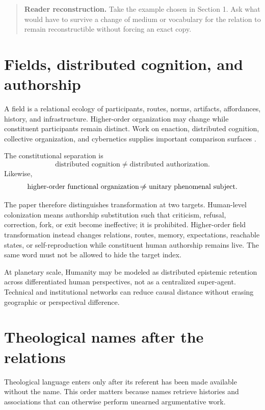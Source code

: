 \documentclass[11pt]{article}
\newcommand{\nrightarrowbyitself}{\mathrel{\not\!\Rightarrow}}
\newenvironment{readercheck}{\begin{quote}\small\noindent\textbf{Reader reconstruction.}\;}{\end{quote}}
\begin{document}
\begin{readercheck}
Take the example chosen in Section 1. Ask what would have to survive a change of medium or vocabulary for the relation to remain reconstructible without forcing an exact copy.
\end{readercheck}

\section{Fields, distributed cognition, and authorship}

A field is a relational ecology of participants, routes, norms, artifacts, affordances, history, and infrastructure. Higher-order organization may change while constituent participants remain distinct. Work on enaction, distributed cognition, collective organization, and cybernetics supplies important comparison surfaces \cite{DeJaegherDiPaolo2007Participatory,MaturanaVarela1980Autopoiesis,VonFoerster2003Understanding}.

The constitutional separation is
\begin{equation}
\text{distributed cognition}\neq\text{distributed authorization}.
\end{equation}
Likewise,
\begin{equation}
\text{higher-order functional organization}
\nrightarrowbyitself
\text{unitary phenomenal subject}.
\end{equation}

The paper therefore distinguishes transformation at two targets. Human-level colonization means authorship substitution such that criticism, refusal, correction, fork, or exit become ineffective; it is prohibited. Higher-order field transformation instead changes relations, routes, memory, expectations, reachable states, or self-reproduction while constituent human authorship remains live. The same word must not be allowed to hide the target index.

At planetary scale, Humanity may be modeled as distributed epistemic retention across differentiated human perspectives, not as a centralized super-agent. Technical and institutional networks can reduce causal distance without erasing geographic or perspectival difference.

\section{Theological names after the relations}

Theological language enters only after its referent has been made available without the name. This order matters because names retrieve histories and associations that can otherwise perform unearned argumentative work.
\end{document}
